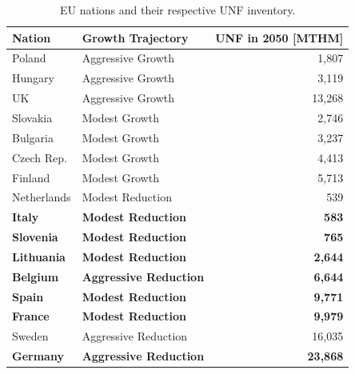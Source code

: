 \documentclass{article}
\begin{document}
\begin{table}[h]
    \centering
    \caption {\gls{EU} nations and their respective \gls{UNF} inventory.} 
                \begin{tabularx}{\textwidth}{llr}
                    \hline 
                    \textbf{Nation} & \textbf{Growth Trajectory} & \small{\textbf{UNF in 2050 [MTHM] }}\\
                    \hline
                    Poland & Aggressive Growth & 1,807\\
                    Hungary & Aggressive Growth & 3,119 \\ 
                    UK & Aggressive Growth & 13,268\\
                    Slovakia & Modest Growth & 2,746\\
                    Bulgaria & Modest Growth & 3,237 \\
                    Czech Rep. & Modest Growth & 4,413\\
                    Finland & Modest Growth &  5,713\\
                    Netherlands & Modest Reduction & 539\\
                    \textbf{Italy} & \textbf{Modest Reduction} & \textbf{583}\\
                    \textbf{Slovenia} & \textbf{Modest Reduction} & \textbf{765}\\
                    \textbf{Lithuania} & \textbf{Modest Reduction} & \textbf{2,644} \\
                    \textbf{Belgium} & \textbf{Aggressive Reduction} & \textbf{6,644}\\
                    \textbf{Spain} & \textbf{Modest Reduction} &  \textbf{9,771} \\
                    \textbf{France} & \textbf{Modest Reduction} & \textbf{9,979} \\
                    Sweden & Aggressive Reduction & 16,035\\
                    \textbf{Germany} & \textbf{Aggressive Reduction} & \textbf{23,868}\\
                    \hline
                \end{tabularx}
    
    \label{tab:which_send}

\end{table}
\end{document}
